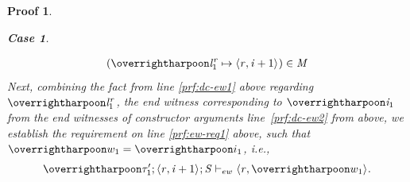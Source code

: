 \documentclass[showabstract,showacknowledgments,showpreface,showdedication]{iuphd}
\newtheorem*{bcase}{Case}
\theoremstyle{nonumberplain}
\newtheorem{nproof}{Proof}
\begin{document}
\begin{nproof}
\begin{bcase}
\begin{itemize}
\begin{itemize}
\begin{itemize}
\begin{align*}
                      (\overharpoon{\locreg{\loc}{\reg}_1} \mapsto \concreteloc{\reg}{\ind + 1}{})  \in \MENV
           \end{align*}
           Next, combining the fact from line \ref{prf:dc-ew1} above regarding $\overharpoon{\locreg{\loc}{\reg}_1}$, the
           end witness corresponding to $\overharpoon{\ind_1}$ from the end witnesses of 
           constructor arguments line~\ref{prf:dc-ew2} from above, we
           establish the requirement on line \ref{prf:ew-req1} above, such that $\overharpoon{w_1} = \overharpoon{i_1}$, i.e.,
           \begin{align}
           \ewitness{\overharpoon{\TYP'_1}}{\concreteloc{\reg}{\ind + 1}{}}{\STOR}{\concreteloc{\reg}{\overharpoon{w_1}}{}} \label{prf:dc-ew-f1}.
           \end{align}
          

\end{itemize}
\end{itemize}
\end{itemize}
\end{bcase}
\end{nproof}
\end{document}
